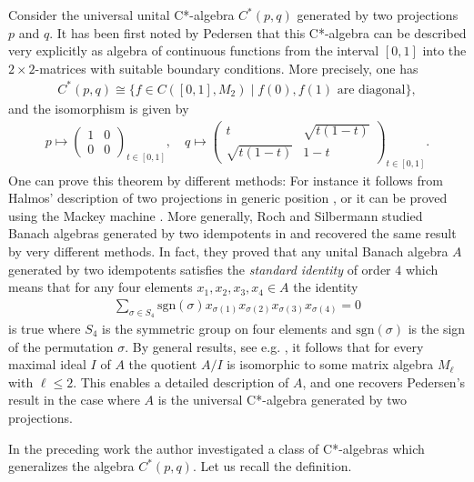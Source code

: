 \documentclass[a4paper]{amsart}
\begin{document}
Consider the universal unital C*-algebra $C^*(p,q)$ generated by two projections $p$ and $q$. It has been first noted by Pedersen \cite{pedersen_measure_1968} that this C*-algebra can be described very explicitly as algebra of continuous functions from the interval $[0,1]$ into the $2 \times 2$-matrices with suitable boundary conditions. More precisely, one has
\begin{align}
  \label{intro::eq:C*(p,q)_as_continuous_functions}
  C^\ast(p,q) \cong \{ f \in C([0,1], M_2) \mid f(0), f(1) \text{ are diagonal} \},
\end{align}
and the isomorphism is given by 
\begin{align*}
  p \mapsto \begin{pmatrix}
    1 & 0 \\
    0 & 0
  \end{pmatrix}_{t \in [0,1]}, \quad
  q \mapsto \begin{pmatrix}
    t & \sqrt{t(1-t)} \\
    \sqrt{t(1-t)} & 1-t
  \end{pmatrix}_{t \in [0,1]}.
\end{align*}
One can prove this theorem by different methods: For instance it follows from Halmos' description of two projections in generic position \cite{halmos_two_1969}, or it can be proved using the Mackey machine \cite{raeburn_c-algebra_1989}. More generally, Roch and Silbermann studied Banach algebras generated by two idempotents in \cite{roch_algebras_1988} and recovered the same result by very different methods. In fact, they proved that any unital Banach algebra $A$ generated by two idempotents satisfies the \emph{standard identity} of order $4$ which means that for any four elements $x_1, x_2, x_3, x_4 \in A$ the identity
\begin{align*}
  \sum_{\sigma \in S_4} \mathrm{sgn}(\sigma) x_{\sigma(1)} x_{\sigma(2)} x_{\sigma(3)} x_{\sigma(4)} = 0
\end{align*}
is true where $S_4$ is the symmetric group on four elements and $\mathrm{sgn}(\sigma)$ is the sign of the permutation $\sigma$. By general results, see e.g. \cite{krupnik_banach_1987}, it follows that for every maximal ideal $I$ of $A$ the quotient $A/I$ is isomorphic to some matrix algebra $M_\ell$ with $\ell \leq 2$. This enables a detailed description of $A$, and one recovers Pedersen's result in the case where $A$ is the universal C*-algebra generated by two projections.

In the preceding work \cite{schafer_classification_2025} the author investigated a class of C*-algebras which generalizes the algebra $C^\ast(p,q)$. Let us recall the definition.
\end{document}
